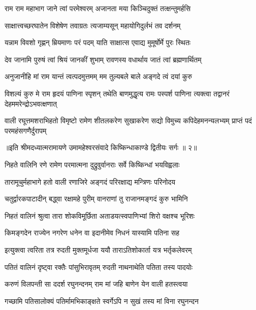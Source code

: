 \twolineshloka
{राम राम महाभाग जाने त्वां परमेश्वरम्}
{अजानता मया किञ्चिदुक्तं तत्क्षन्तुमर्हसि} %

\twolineshloka
{साक्षात्त्वच्छरघातेन विशेषेण तवाग्रतः}
{त्यजाम्यसून् महायोगिदुर्लभं तव दर्शनम्} %

\twolineshloka
{यन्नाम विवशो गृह्णन् म्रियमाणः परं पदम्}
{याति साक्षात्स एवाद्य मुमूर्षोर्मे पुरः स्थितः} %

\twolineshloka
{देव जानामि पुरुषं त्वां श्रियं जानकीं शुभाम्}
{रावणस्य वधार्थाय जातं त्वां ब्रह्मणार्थितम्} %

\twolineshloka
{अनुजानीहि मां राम यान्तं त्वत्पदमुत्तमम्}
{मम तुल्यबले बाले अङ्गदे त्वं दयां कुरु} %

\threelineshloka
{विशल्यं कुरु मे राम हृदयं पाणिना स्पृशन्}
{तथेति बाणमुद्धृत्य रामः पस्पर्श पाणिना}
{त्यक्त्वा तद्वानरं देहममरेन्द्रोऽभवत्क्षणात्} %

\fourlineindentedshloka
{वाली रघूत्तमशराभिहतो विमृष्टो}
{रामेण शीतलकरेण सुखाकरेण}
{सद्यो विमुच्य कपिदेहमनन्यलभ्यम्}
{प्राप्तं पदं परमहंसगणैर्दुरापम्} %

{॥इति श्रीमदध्यात्मरामायणे उमामहेश्वरसंवादे किष्किन्धाकाण्डे
द्वितीयः सर्गः ॥ २॥
}




\twolineshloka
{निहते वालिनि रणे रामेण परमात्मना}
{दुद्रुवुर्वानराः सर्वे किष्किन्धां भयविह्वलाः} %

\twolineshloka
{तारामूचुर्महाभागे हतो वाली रणाजिरे}
{अङ्गदं परिरक्षाद्य मन्त्रिणः परिनोदय} %

\twolineshloka
{चतुर्द्वारकपाटादीन् बद्ध्वा रक्षामहे पुरीम्}
{वानराणां तु राजानमङ्गदं कुरु भामिनि} %

\twolineshloka
{निहतं वालिनं श्रुत्वा तारा शोकविमूर्छिता}
{अताडयत्स्वपाणिभ्यां शिरो वक्षश्च भूरिशः} %

\twolineshloka
{किमङ्गदेन राज्येन नगरेण धनेन वा}
{इदानीमेव निधनं यास्यामि पतिना सह} %

\twolineshloka
{इत्युक्त्वा त्वरिता तत्र रुदती मुक्तमूर्धजा}
{ययौ ताराऽतिशोकार्ता यत्र भर्तृकलेवरम्} %

\twolineshloka
{पतितं वालिनं दृष्ट्वा रक्तैः पांसुभिरावृतम्}
{रुदती नाथनाथेति पतिता तस्य पादयोः} %

\twolineshloka
{करुणं विलपन्ती सा ददर्श रघुनन्दनम्}
{राम मां जहि बाणेन येन वाली हतस्त्वया} %

\twolineshloka
{गच्छामि पतिसालोक्यं पतिर्मामभिकाङ्क्षते}
{स्वर्गेऽपि न सुखं तस्य मां विना रघुनन्दन} %

